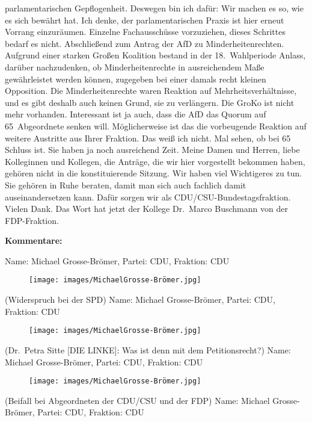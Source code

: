 \documentclass[10pt, a4paper]{report}
\begin{document}
parlamentarischen Gepflogenheit. Deswegen bin ich dafür: Wir machen es so, wie es sich bewährt hat. Ich denke, der parlamentarischen Praxis ist hier erneut Vorrang einzuräumen. Einzelne Fachausschüsse vorzuziehen, dieses Schrittes bedarf es nicht. Abschließend zum Antrag der AfD zu Minderheitenrechten. Aufgrund einer starken Großen Koalition bestand in der 18. Wahlperiode Anlass, darüber nachzudenken, ob Minderheitenrechte in ausreichendem Maße gewährleistet werden können, zugegeben bei einer damals recht kleinen Opposition. Die Minderheitenrechte waren Reaktion auf Mehrheitsverhältnisse, und es gibt deshalb auch keinen Grund, sie zu verlängern. Die ­GroKo ist nicht mehr vorhanden. Interessant ist ja auch, dass die AfD das Quorum auf 65 Abgeordnete senken will. Möglicherweise ist das die vorbeugende Reaktion auf weitere Austritte aus Ihrer Fraktion. Das weiß ich nicht. Mal sehen, ob bei 65 Schluss ist. Sie haben ja noch ausreichend Zeit. Meine Damen und Herren, liebe Kolleginnen und Kollegen, die Anträge, die wir hier vorgestellt bekommen haben, gehören nicht in die konstituierende Sitzung. Wir haben viel Wichtigeres zu tun. Sie gehören in Ruhe beraten, damit man sich auch fachlich damit auseinandersetzen kann. Dafür sorgen wir als CDU/CSU-Bundestagsfraktion. Vielen Dank. Das Wort hat jetzt der Kollege Dr. Marco Buschmann von der FDP-Fraktion. 

\textbf{Kommentare:}

Name: Michael Grosse-Brömer, Partei: CDU, Fraktion: CDU

\begin{figure}[!ht]
\texttt{[image: images/MichaelGrosse-Brömer.jpg]}
\end{figure}


(Widerspruch bei der SPD)
Name: Michael Grosse-Brömer, Partei: CDU, Fraktion: CDU

\begin{figure}[!ht]
\texttt{[image: images/MichaelGrosse-Brömer.jpg]}
\end{figure}


(Dr. Petra Sitte [DIE LINKE]: Was ist denn mit dem Petitionsrecht?)
Name: Michael Grosse-Brömer, Partei: CDU, Fraktion: CDU

\begin{figure}[!ht]
\texttt{[image: images/MichaelGrosse-Brömer.jpg]}
\end{figure}


(Beifall bei Abgeordneten der CDU/CSU und der FDP)
Name: Michael Grosse-Brömer, Partei: CDU, Fraktion: CDU
\end{document}
